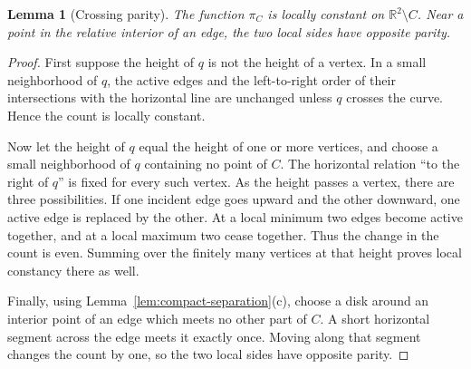 \documentclass[11pt]{article}
\theoremstyle{mainplain}
\newtheorem{lemma}[theorem]{Lemma}
\theoremstyle{mainroman}
\theoremstyle{definition}
\numberwithin{equation}{section}
\begin{document}
\begin{lemma}[Crossing parity]\label{lem:polygon-parity}
The function $\pi_C$ is locally constant on
$\mathbb R^2\setminus C$. Near a point in the relative interior of an
edge, the two local sides have opposite parity.
\end{lemma}
\begin{proof}
First suppose the height of $q$ is not the height of a vertex. In a
small neighborhood of $q$, the active edges and the left-to-right order
of their intersections with the horizontal line are unchanged unless
$q$ crosses the curve. Hence the count is locally constant.

Now let the height of $q$ equal the height of one or more vertices, and
choose a small neighborhood of $q$ containing no point of $C$. The
horizontal relation ``to the right of $q$'' is fixed for every such
vertex. As the height passes a vertex, there are three possibilities.
If one incident edge goes upward and the other downward, one active
edge is replaced by the other. At a local minimum two edges become
active together, and at a local maximum two cease together. Thus the
change in the count is even. Summing over the finitely many vertices at
that height proves local constancy there as well.

Finally, using Lemma~\ref{lem:compact-separation}\textup{(c)}, choose
a disk around an interior point of an edge which meets
no other part of $C$. A short horizontal segment across the edge meets
it exactly once. Moving along that segment changes the count by one,
so the two local sides have opposite parity.
\end{proof}
\end{document}
